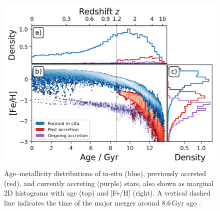 \documentclass[fleqn,usenatbib]{mnras}
\begin{document}
\begin{figure}
    \centering
    \includegraphics[width=\columnwidth]{figures/tracing_insitu_accretion_3.png}
    \caption{Age–metallicity distributions of in-situ (blue), previously accreted (red), and currently accreting (purple) stars, also shown as marginal 2D histograms with age (top) and [Fe/H] (right). A vertical dashed line indicates the time of the major merger around $8.6\,\mathrm{Gyr}$ ago \href{https://github.com/svenbuder/golden_thread_I/tree/main/figures}{\faGithub}.}
    \label{fig:tracing_insitu_accretion_3}
\end{figure}
\end{document}
